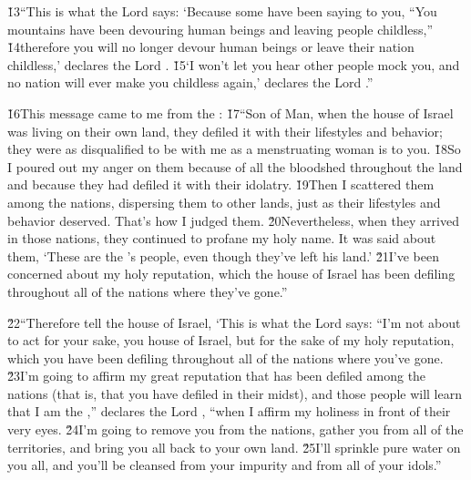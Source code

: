 \v{13}``This is what the Lord  says: `Because some have been saying to you, ``You mountains have been devouring human beings and leaving people childless,'' \v{14}therefore you will no longer devour human beings or leave their nation childless,' declares the Lord . \v{15}`I won't let you hear other people mock you, and no nation will ever make you childless again,' declares the Lord .''

\v{16}This message came to me from the : \v{17}``Son of Man, when the house of Israel was living on their own land, they defiled it with their lifestyles and behavior; they were as disqualified to be with me as a menstruating woman is to you. \v{18}So I poured out my anger on them because of all the bloodshed throughout the land and because they had defiled it with their idolatry. \v{19}Then I scattered them among the nations, dispersing them to other lands, just as their lifestyles and behavior deserved. That's how I judged them. \v{20}Nevertheless, when they arrived in those nations, they continued to profane my holy name. It was said about them, `These are the 's people, even though they've left his land.' \v{21}I've been concerned about my holy reputation, which the house of Israel has been defiling throughout all of the nations where they've gone.''

\v{22}``Therefore tell the house of Israel, `This is what the Lord  says: ``I'm not about to act for your sake, you house of Israel, but for the sake of my holy reputation, which you have been defiling throughout all of the nations where you've gone. \v{23}I'm going to affirm my great reputation that has been defiled among the nations (that is, that you have defiled in their midst), and those people will learn that I am the ,'' declares the Lord , ``when I affirm my holiness in front of their very eyes. \v{24}I'm going to remove you from the nations, gather you from all of the territories, and bring you all back to your own land. \v{25}I'll sprinkle pure water on you all, and you'll be cleansed from your impurity and from all of your idols.''

